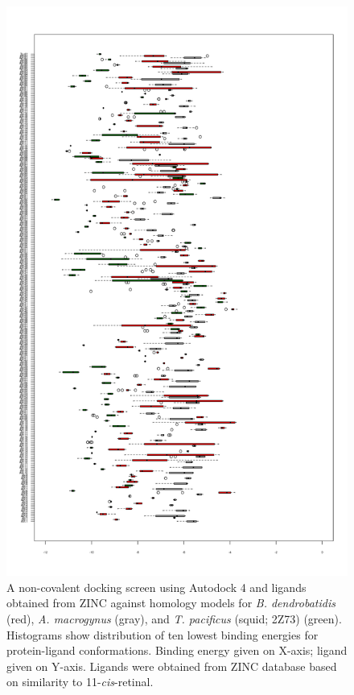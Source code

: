 \begin{figure}[hb]
  \includegraphics[]{./Chapter_RhodStruct/img/dockPlot.png}
  \caption[Docking screen for \textit{Bd} and \textit{Am} models]{A non-covalent docking screen using Autodock 4 and ligands obtained from ZINC against homology models for \textit{B. dendrobatidis} (red), \textit{A. macrogynus} (gray), and \textit{T. pacificus} (squid; 2Z73) (green). Histograms show distribution of ten lowest binding energies for protein-ligand conformations. Binding energy given on X-axis; ligand given on Y-axis. Ligands were obtained from ZINC database based on similarity to 11-\textit{cis}-retinal.}
  \label{fig:ChRhodS_NonCovDock}
\end{figure}

